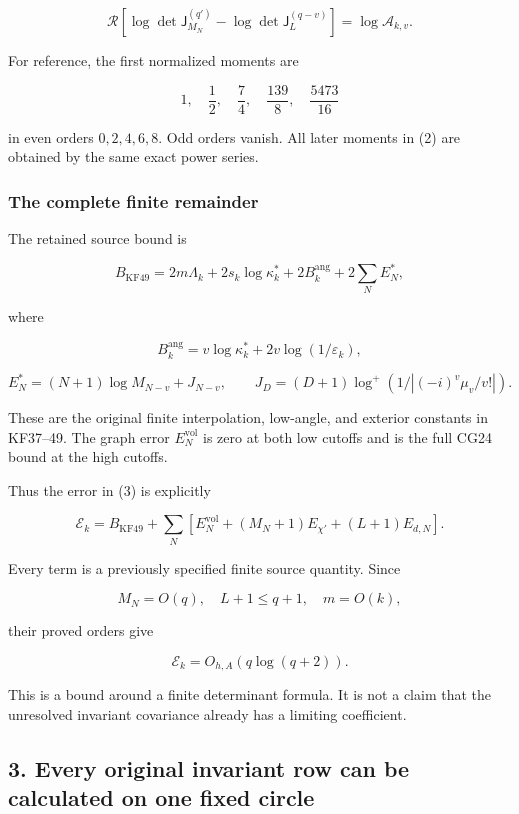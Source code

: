 \documentclass[11pt]{article}
\begin{document}
\[
\boxed{
\mathcal R
\left[
\log\det\mathsf J_{M_N}^{(q')}
-\log\det\mathsf J_L^{(q-v)}
\right]
=\log\mathcal A_{k,v}.
}
\tag{11}
\]

For reference, the first normalized moments are

\[
1,\quad \frac12,\quad \frac74,\quad
\frac{139}{8},\quad \frac{5473}{16}
\]

in even orders \(0,2,4,6,8\). Odd orders vanish. All later moments in (2) are obtained by the same exact power series.

\subsubsection{The complete finite remainder}\label{the-complete-finite-remainder}

The retained source bound is

\[
B_{\mathrm{KF49}}
=
2m\Lambda_k
+2s_k\log\kappa_k^*
+2B_k^{\mathrm{ang}}
+2\sum_NE_N^*,
\]

where

\[
B_k^{\mathrm{ang}}
=
v\log\kappa_k^*
+2v\log(1/\varepsilon_k),
\]

\[
E_N^*=(N+1)\log M_{N-v}+J_{N-v},
\qquad
J_D=(D+1)\log^+(1/|(-i)^v\mu_v/v!|).
\tag{12}
\]

These are the original finite interpolation, low-angle, and exterior constants in KF37--49. The graph error \(E_N^{\mathrm{vol}}\) is zero at both low cutoffs and is the full CG24 bound at the high cutoffs.

Thus the error in (3) is explicitly

\[
\boxed{
\mathcal E_k
=
B_{\mathrm{KF49}}
+\sum_N
\left[
E_N^{\mathrm{vol}}
+(M_N+1)E_{\chi'}
+(L+1)E_{d,N}
\right].
}
\tag{13}
\]

Every term is a previously specified finite source quantity. Since

\[
M_N=O(q),\quad L+1\le q+1,\quad m=O(k),
\]

their proved orders give

\[
\mathcal E_k=O_{h,A}(q\log(q+2)).
\]

This is a bound around a finite determinant formula. It is not a claim that the unresolved invariant covariance already has a limiting coefficient.

\subsection{3. Every original invariant row can be calculated on one fixed circle}\label{every-original-invariant-row-can-be-calculated-on-one-fixed-circle}
\end{document}
